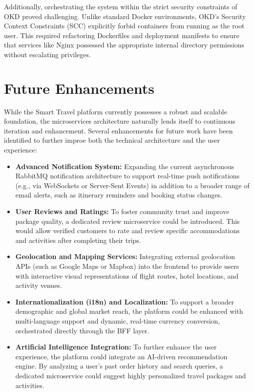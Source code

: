 Additionally, orchestrating the system within the strict security constraints of OKD proved challenging. Unlike standard Docker environments, OKD's Security Context Constraints (SCC) explicitly forbid containers from running as the root user. This required refactoring Dockerfiles and deployment manifests to ensure that services like Nginx possessed the appropriate internal directory permissions without escalating privileges. 

\section{Future Enhancements}

While the Smart Travel platform currently possesses a robust and scalable foundation, the microservices architecture naturally lends itself to continuous iteration and enhancement. Several enhancements for future work have been identified to further improe both the technical architecture and the user experience:

\begin{itemize}
    \item \textbf{Advanced Notification System:} Expanding the current asynchronous RabbitMQ notification architecture to support real-time push notifications (e.g., via WebSockets or Server-Sent Events) in addition to a broader range of email alerts, such as itinerary reminders and booking status changes.
    
    \item \textbf{User Reviews and Ratings:} To foster community trust and improve package quality, a dedicated review microservice could be introduced. This would allow verified customers to rate and review specific accommodations and activities after completing their trips.
    
    \item \textbf{Geolocation and Mapping Services:} Integrating external geolocation APIs (such as Google Maps or Mapbox) into the frontend to provide users with interactive visual representations of flight routes, hotel locations, and activity venues.
    
    \item \textbf{Internationalization (i18n) and Localization:} To support a broader demographic and global market reach, the platform could be enhanced with multi-language support and dynamic, real-time currency conversion, orchestrated directly through the BFF layer.
    
    \item \textbf{Artificial Intelligence Integration:} To further enhance the user experience, the platform could integrate an AI-driven recommendation engine. By analyzing a user's past order history and search queries, a dedicated microservice could suggest highly personalized travel packages and activities.
\end{itemize}